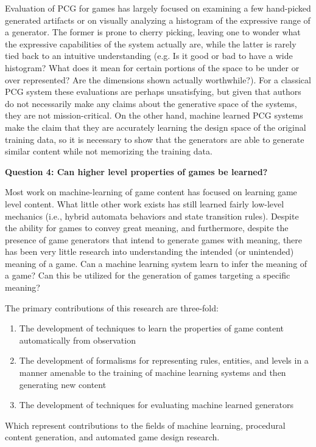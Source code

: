 \documentclass[12pt]{report}
\begin{document}
Evaluation of PCG for games has largely focused on examining a few hand-picked generated artifacts or on visually analyzing a histogram of the expressive range of a generator.  The former is prone to cherry picking, leaving one to wonder what the expressive capabilities of the system actually are, while the latter is rarely tied back to an intuitive understanding (e.g. Is it good or bad to have a wide histogram? What does it mean for certain portions of the space to be under or over represented? Are the dimensions shown actually worthwhile?).  For a classical PCG system these evaluations are perhaps unsatisfying, but given that authors do not necessarily make any claims about the generative space of the systems, they are not mission-critical.  On the other hand, machine learned PCG systems make the claim that they are accurately learning the design space of the original training data, so it is necessary to show that the generators are able to generate similar content while not memorizing the training data.


\textbf{Question 4: Can higher level properties of games be learned?}

Most work on machine-learning of game content has focused on learning game level content.  What little other work exists has still learned fairly low-level mechanics (i.e., hybrid automata behaviors and state transition rules).  Despite the ability for games to convey great meaning, and furthermore, despite the presence of game generators that intend to generate games with meaning, there has been very little research into understanding the intended (or unintended) meaning of a game. Can a machine learning system learn to infer the meaning of a game?  Can this be utilized for the generation of games targeting a specific meaning?



The primary contributions of this research are three-fold:
\begin{enumerate}
\item The development of techniques to learn the properties of game content automatically from observation
\item The development of formalisms for representing rules, entities, and levels in a manner amenable to the training of machine learning systems and then generating new content 
\item The development of techniques for evaluating machine learned generators
\end{enumerate}


Which represent contributions to the fields of machine learning, procedural content generation, and automated game design research.
\end{document}
